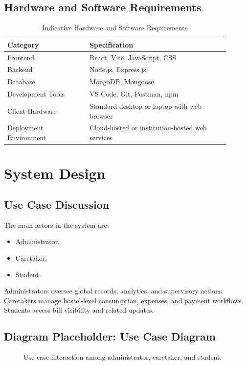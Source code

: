 \documentclass[conference]{IEEEtran}
\begin{document}
\subsection{Hardware and Software Requirements}
\begin{table}[H]
\centering
\caption{Indicative Hardware and Software Requirements}
\label{tab:req}
\begin{tabular}{p{0.33\linewidth} p{0.57\linewidth}}
\toprule
\textbf{Category} & \textbf{Specification} \\
\midrule
Frontend & React, Vite, JavaScript, CSS \\
Backend & Node.js, Express.js \\
Database & MongoDB, Mongoose \\
Development Tools & VS Code, Git, Postman, npm \\
Client Hardware & Standard desktop or laptop with web browser \\
Deployment Environment & Cloud-hosted or institution-hosted web services \\
\bottomrule
\end{tabular}
\end{table}

\section{System Design}
\subsection{Use Case Discussion}
The main actors in the system are:
\begin{itemize}
\item Administrator,
\item Caretaker,
\item Student.
\end{itemize}

Administrators oversee global records, analytics, and supervisory actions. Caretakers manage hostel-level consumption, expenses, and payment workflows. Students access bill visibility and related updates.

\subsection{Diagram Placeholder: Use Case Diagram}
\begin{figure}[H]
\centering
{}
\caption{Use case interaction among administrator, caretaker, and student.}
\label{fig:usecase}
\end{figure}
\end{document}
